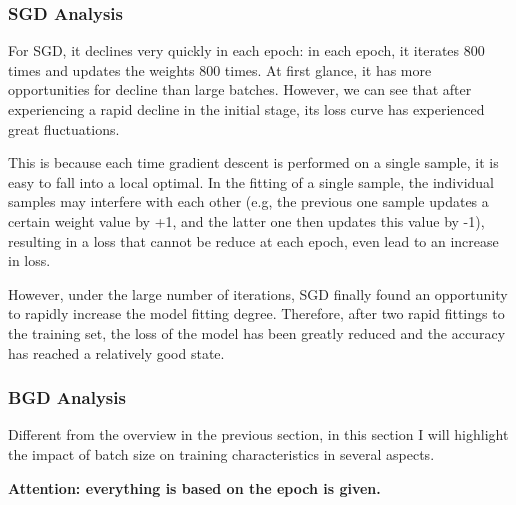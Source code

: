   \subsubsection{SGD Analysis}

  For SGD, it declines very quickly in each epoch: in each epoch, it iterates 800 times and updates the weights 800 times.
  At first glance, it has more opportunities for decline than large batches.
  However, we can see that after experiencing a rapid decline in the initial stage, its loss curve has experienced great fluctuations.

  This is because each time gradient descent is performed on a single sample, it is easy to fall into a local optimal.
  In the fitting of a single sample, the individual samples may interfere with each other (e.g, the previous one sample updates a certain weight value by +1, and the latter one then updates this value by -1),
  resulting in a loss that cannot be reduce at each epoch, even lead to an increase in loss.

  However, under the large number of iterations, SGD finally found an opportunity to rapidly increase the model fitting degree.
  Therefore, after two rapid fittings to the training set, the loss of the model has been greatly reduced and the accuracy has reached a relatively good state.

  \subsubsection{BGD Analysis}

  Different from the overview in the previous section, in this section I will highlight the impact of batch size on training characteristics in several aspects.

  \textbf{Attention: everything is based on the epoch is given.}

